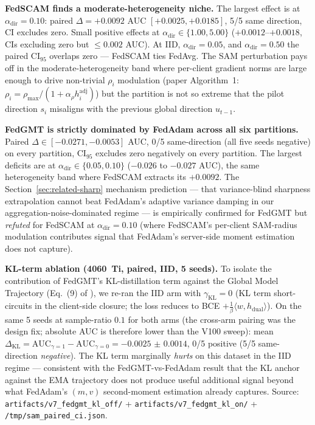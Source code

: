 \documentclass[journal]{IEEEtran}
\newcommand{\alphadir}{\ensuremath{\alpha_{\mathrm{dir}}}}
\begin{document}
\textbf{FedSCAM finds a moderate-heterogeneity niche.} The largest effect is at $\alphadir = 0.10$: paired $\Delta = +0.0092$ AUC $[+0.0025, +0.0185]$, 5/5 same direction, CI excludes zero. Small positive effects at $\alphadir \in \{1.00, 5.00\}$ ($+0.0012$--$+0.0018$, CIs excluding zero but $\leq 0.002$ AUC). At IID, $\alphadir = 0.05$, and $\alphadir = 0.50$ the paired CI$_{95}$ overlaps zero --- FedSCAM ties FedAvg. The SAM perturbation pays off in the moderate-heterogeneity band where per-client gradient norms are large enough to drive non-trivial $\rho_i$ modulation (paper Algorithm~1: $\rho_i = \rho_{\max} / (1 + \alpha_\rho h_i^{\mathrm{adj}})$) but the partition is not so extreme that the pilot direction $s_i$ misaligns with the previous global direction $u_{t-1}$.

\textbf{FedGMT is strictly dominated by FedAdam across all six partitions.} Paired $\Delta \in [-0.0271, -0.0053]$ AUC, 0/5 same-direction (all five seeds negative) on every partition, CI$_{95}$ excludes zero negatively on every partition. The largest deficits are at $\alphadir \in \{0.05, 0.10\}$ ($-0.026$ to $-0.027$ AUC), the same heterogeneity band where FedSCAM extracts its $+0.0092$. The Section~\ref{sec:related-sharp} mechanism prediction --- that variance-blind sharpness extrapolation cannot beat FedAdam's adaptive variance damping in our aggregation-noise-dominated regime --- is empirically confirmed for FedGMT but \emph{refuted} for FedSCAM at $\alphadir = 0.10$ (where FedSCAM's per-client SAM-radius modulation contributes signal that FedAdam's server-side moment estimation does not capture).

\textbf{KL-term ablation (4060~Ti, paired, IID, 5 seeds).} To isolate the contribution of FedGMT's KL-distillation term against the Global Model Trajectory (Eq.~(9) of \cite{FedGMT2025}), we re-ran the IID arm with $\gamma_{\mathrm{KL}} = 0$ (KL term short-circuits in the client-side closure; the loss reduces to BCE $+ \frac{1}{\beta}\langle w, h_{\mathrm{dual}} \rangle$). On the same 5 seeds at sample-ratio $0.1$ for both arms (the cross-arm pairing was the design fix; absolute AUC is therefore lower than the V100 sweep): mean $\Delta_{\mathrm{KL}} = \mathrm{AUC}_{\gamma=1} - \mathrm{AUC}_{\gamma=0} = -0.0025$ $\pm$ $0.0014$, 0/5 positive (5/5 same-direction \emph{negative}). The KL term marginally \emph{hurts} on this dataset in the IID regime --- consistent with the FedGMT-vs-FedAdam result that the KL anchor against the EMA trajectory does not produce useful additional signal beyond what FedAdam's $(m, v)$ second-moment estimation already captures. Source: \lstinline|artifacts/v7_fedgmt_kl_off/| + \lstinline|artifacts/v7_fedgmt_kl_on/| + \lstinline|/tmp/sam_paired_ci.json|.
\end{document}
